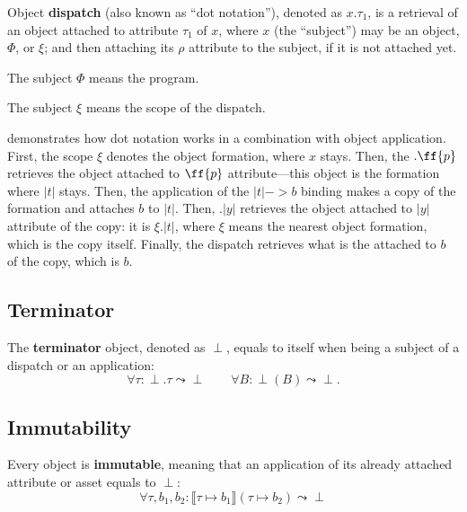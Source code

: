 \begin{definition}[Dispatch]
Object \textbf{dispatch} (also known as ``dot notation''), denoted as $x.\tau_1$, is a retrieval of an object attached to attribute \(\tau_1\) of \(x\), where \(x\) (the ``subject'') may be an object, \(\Phi\), or \(\xi\); and then attaching its \(\rho\) attribute to the subject, if it is not attached yet.
\end{definition}

The subject \(\Phi\) means the program.

The subject \(\xi\) means the scope of the dispatch.

 demonstrates how dot notation works in a combination with object application. First, the scope \(\xi\) denotes the object formation, where \(x\) stays. Then, the \(.\ff{p}\) retrieves the object attached to \(\ff{p}\) attribute---this object is the formation where \(|t|\) stays. Then, the application of the $|t|->b$ binding makes a copy of the formation and attaches \(b\) to \(|t|\). Then, \(.|y|\) retrieves the object attached to \(|y|\) attribute of the copy: it is \(\xi.|t|\), where \(\xi\) means the nearest object formation, which is the copy itself. Finally, the dispatch retrieves what is the attached to \(b\) of the copy, which is \(b\).

\subsection{Terminator}

\begin{definition}[Terminator]
The \textbf{terminator} object, denoted as \(\perp\), equals to itself when being a subject of a dispatch or an application:
\begin{equation*}
\forall \tau : \perp.\tau \leadsto \perp \qquad \forall B : \perp(B) \leadsto \perp.
\end{equation*}
\end{definition}

\subsection{Immutability}

\begin{definition}[Immutability]
Every object is \textbf{immutable}, meaning that an application of its already attached attribute or asset equals to \(\perp\):
\begin{equation*}
\forall \tau, b_1, b_2 : \llbracket \tau \mapsto b_1 \rrbracket ( \tau \mapsto b_2 ) \leadsto \perp
\end{equation*}
\end{definition}

